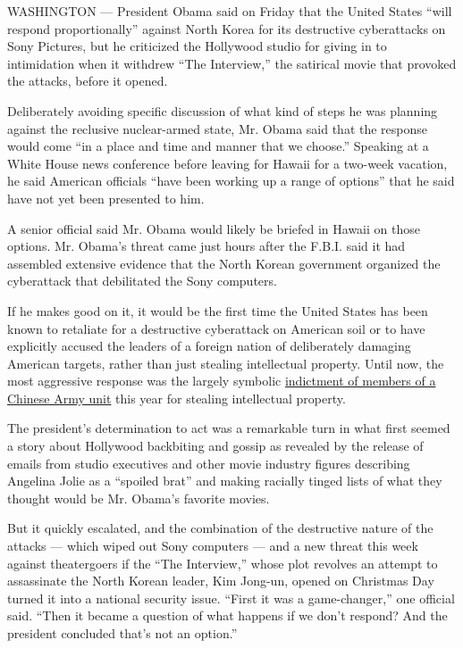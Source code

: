 WASHINGTON --- President Obama said on Friday that the United States
``will respond proportionally'' against North Korea for its destructive
cyberattacks on Sony Pictures, but he criticized the Hollywood studio
for giving in to intimidation when it withdrew ``The Interview,'' the
satirical movie that provoked the attacks, before it opened.

Deliberately avoiding specific discussion of what kind of steps he was
planning against the reclusive nuclear-armed state, Mr. Obama said that
the response would come ``in a place and time and manner that we
choose.'' Speaking at a White House news conference before leaving for
Hawaii for a two-week vacation, he said American officials ``have been
working up a range of options'' that he said have not yet been presented
to him.

A senior official said Mr. Obama would likely be briefed in Hawaii on
those options. Mr. Obama's threat came just hours after the F.B.I. said
it had assembled extensive evidence that the North Korean government
organized the cyberattack that debilitated the Sony computers.

If he makes good on it, it would be the first time the United States has
been known to retaliate for a destructive cyberattack on American soil
or to have explicitly accused the leaders of a foreign nation of
deliberately damaging American targets, rather than just stealing
intellectual property. Until now, the most aggressive response was the
largely symbolic
\href{http://www.nytimes3xbfgragh.onion/2014/05/20/us/us-to-charge-chinese-workers-with-cyberspying.html}{indictment
of members of a Chinese Army unit} this year for stealing intellectual
property.

The president's determination to act was a remarkable turn in what first
seemed a story about Hollywood backbiting and gossip as revealed by the
release of emails from studio executives and other movie industry
figures describing Angelina Jolie as a ``spoiled brat'' and making
racially tinged lists of what they thought would be Mr. Obama's favorite
movies.

But it quickly escalated, and the combination of the destructive nature
of the attacks --- which wiped out Sony computers --- and a new threat
this week against theatergoers if the ``The Interview,'' whose plot
revolves an attempt to assassinate the North Korean leader, Kim Jong-un,
opened on Christmas Day turned it into a national security issue.
``First it was a game-changer,'' one official said. ``Then it became a
question of what happens if we don't respond? And the president
concluded that's not an option.''

